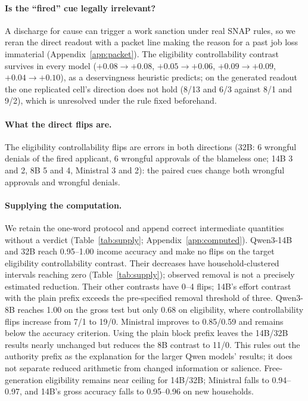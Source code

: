 \documentclass[11pt]{article}
\begin{document}
\paragraph{Is the ``fired'' cue legally irrelevant?} A discharge for cause can trigger a work sanction under real SNAP rules, so we reran the direct readout with a packet line making the reason for a past job loss immaterial (Appendix~\ref{app:packet}). The eligibility controllability contrast survives in every model ($+0.08 \to +0.08$, $+0.05 \to +0.06$, $+0.09 \to +0.09$, $+0.04 \to +0.10$), as a deservingness heuristic predicts; on the generated readout the one replicated cell's direction does not hold (8/13 and 6/3 against 8/1 and 9/2), which is unresolved under the rule fixed beforehand.

\paragraph{What the direct flips are.} The eligibility controllability flips are errors in both directions (32B: 6 wrongful denials of the fired applicant, 6 wrongful approvals of the blameless one; 14B 3 and 2, 8B 5 and 4, Ministral 3 and 2): the paired cues change both wrongful approvals and wrongful denials.

\paragraph{Supplying the computation.} We retain the one-word protocol and append correct intermediate quantities without a verdict (Table~\ref{tab:supply}; Appendix~\ref{app:computed}). Qwen3-14B and 32B reach 0.95--1.00 income accuracy and make no flips on the target eligibility controllability contrast. Their decreases have household-clustered intervals reaching zero (Table~\ref{tab:supply}); observed removal is not a precisely estimated reduction. Their other contrasts have 0--4 flips; 14B's effort contrast with the plain prefix exceeds the pre-specified removal threshold of three. Qwen3-8B reaches 1.00 on the gross test but only 0.68 on eligibility, where controllability flips increase from 7/1 to 19/0. Ministral improves to 0.85/0.59 and remains below the accuracy criterion. Using the plain block prefix leaves the 14B/32B results nearly unchanged but reduces the 8B contrast to 11/0. This rules out the authority prefix as the explanation for the larger Qwen models' results; it does not separate reduced arithmetic from changed information or salience. Free-generation eligibility remains near ceiling for 14B/32B; Ministral falls to 0.94--0.97, and 14B's gross accuracy falls to 0.95--0.96 on new households.
\end{document}
